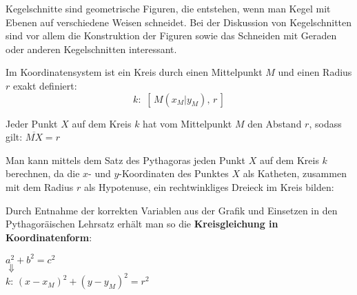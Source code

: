 



\thispagestyle{plain}

Kegelschnitte sind geometrische Figuren, die entstehen, wenn man Kegel mit Ebenen auf verschiedene Weisen schneidet. Bei der Diskussion von Kegelschnitten sind vor allem die Konstruktion der Figuren sowie das Schneiden mit Geraden oder anderen Kegelschnitten interessant.  


Im Koordinatensystem ist ein Kreis durch einen Mittelpunkt $M$ und einen Radius $r$ exakt definiert: $$k:\,\,[\,M(x_{M}|y_{M}),\, r\,]$$

Jeder Punkt $X$ auf dem Kreis $k$ hat vom Mittelpunkt $M$ den Abstand $r$, sodass gilt: $\overbar{MX} = r$

Man kann mittels dem Satz des Pythagoras jeden Punkt $X$ auf dem Kreis $k$ berechnen, da die $x$- und $y$-Koordinaten des Punktes $X$ als Katheten, zusammen mit dem Radius $r$ als Hypotenuse, ein rechtwinkliges Dreieck im Kreis bilden:

\begin{figure}[h!]
	\centering
\end{figure}

Durch Entnahme der korrekten Variablen aus der Grafik und Einsetzen in den Pythagor\"{a}ischen Lehrsatz erh\"{a}lt man so die \textbf{Kreisgleichung in Koordinatenform}:

\begin{center}
	$a^2 + b^2 = c^2$\\
	$\Downarrow$\\
	$k:\, (x - x_{M})^2 + (y - y_{M})^2 = r^2$
\end{center}

